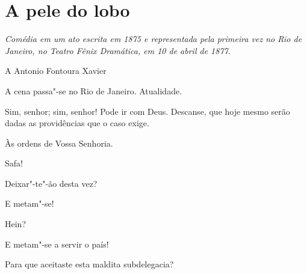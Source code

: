 \chapter{A pele do lobo}

\begin{linenumbers}

\textit{Comédia em um ato escrita em 1875 e representada pela primeira vez no Rio de Janeiro, no
Teatro Fênix Dramática, em 10 de abril de 1877.}
\medskip

\hfill A Antonio Fontoura Xavier


\castpage










\vfil

A cena passa"-se no Rio de Janeiro.
Atualidade.
\pagebreak 



 

 Sim, senhor; sim, senhor! Pode ir com Deus. Descanse, que
hoje mesmo serão dadas as providências que o caso exige.

 Às ordens de Vossa Senhoria. 

 Safa!

   Deixar"-te"-ão desta vez?

 E metam"-se! 

  Hein?

 E metam"-se a servir o país!

 Para que aceitaste esta maldita subdelegacia?


\end{linenumbers}
